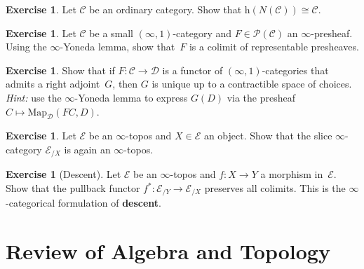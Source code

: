 \documentclass[a4paper,12pt]{book}
\theoremstyle{definition}
\newtheorem{exercise}[definition]{Exercise}
\theoremstyle{plain}
\theoremstyle{remark}
\begin{document}
\begin{exercise}\label{ex:homotopy-cat-nerve}
Let $\mathcal{C}$ be an ordinary category.  Show that
$\mathrm{h}(N(\mathcal{C})) \cong \mathcal{C}$.
\end{exercise}

\begin{exercise}\label{ex:infty-presheaf-colim}
Let $\mathcal{C}$ be a small $(\infty,1)$-category and
$F\in\mathcal{P}(\mathcal{C})$ an $\infty$-presheaf.  Using the
$\infty$-Yoneda lemma, show that~$F$ is a colimit of representable
presheaves.
\end{exercise}

\begin{exercise}\label{ex:infty-adj-unique}
Show that if $F\colon\mathcal{C}\to\mathcal{D}$ is a functor of
$(\infty,1)$-categories that admits a right adjoint~$G$, then $G$ is
unique up to a contractible space of choices.
\textit{Hint:} use the $\infty$-Yoneda lemma to express $G(D)$ via
the presheaf $C\mapsto\mathrm{Map}_\mathcal{D}(FC, D)$.
\end{exercise}

\begin{exercise}\label{ex:infty-topos-slice}
Let $\mathcal{E}$ be an $\infty$-topos and $X\in\mathcal{E}$ an object.
Show that the slice $\infty$-category $\mathcal{E}_{/X}$ is again an
$\infty$-topos.
\end{exercise}

\begin{exercise}[Descent]\label{ex:infty-descent}
Let $\mathcal{E}$ be an $\infty$-topos and $f\colon X\to Y$ a morphism
in~$\mathcal{E}$.  Show that the pullback functor
$f^*\colon\mathcal{E}_{/Y}\to\mathcal{E}_{/X}$ preserves all colimits.
This is the $\infty$-categorical formulation of \textbf{descent}.
\end{exercise}




\appendix

\chapter{Review of Algebra and Topology}\label{app:review}
\minitoc
\end{document}
